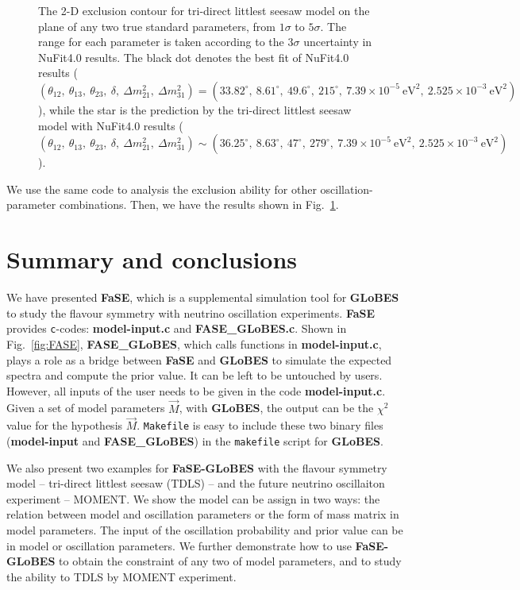 \documentclass[aps,prd,nofootinbib,preprint]{revtex4}
\begin{document}
\begin{figure}[!h]
 \caption{\label{fig:SR_2D}The 2-D exclusion contour for tri-direct littlest seesaw model on the plane of any two true standard parameters, from $1\sigma$ to $5\sigma$. The range for each parameter is taken according to the $3\sigma$ uncertainty in NuFit4.0 results. The black dot denotes the best fit of NuFit4.0 results ($(\theta_{12},~\theta_{13},~\theta_{23},~\delta,~\Delta m_{21}^2,~\Delta m_{31}^2)=(33.82^\circ,~8.61^\circ,~49.6^\circ,~215^\circ,~7.39\times10^{-5}~\text{eV}^2,~2.525\times10^{-3}~\text{eV}^2)$), while the star is the prediction by the tri-direct littlest seesaw model with NuFit4.0 results ($(\theta_{12},~\theta_{13},~\theta_{23},~\delta,~\Delta m_{21}^2,~\Delta m_{31}^2)\sim(36.25^\circ,~8.63^\circ,~47^\circ,~279^\circ,~7.39\times10^{-5}~\text{eV}^2,~2.525\times10^{-3}~\text{eV}^2)$).}
\end{figure}

We use the same code to analysis the exclusion ability for other oscillation-parameter combinations. Then, we have the results shown in Fig.~\ref{fig:SR_2D}.

\section{Summary and conclusions}

We have presented \textbf{FaSE}, which is a supplemental simulation tool for \textbf{GLoBES} to study the flavour symmetry with neutrino oscillation experiments. \textbf{FaSE} provides \texttt{c}-codes: \textbf{model-input.c} and \textbf{FASE\_GLoBES.c}. Shown in Fig.~\ref{fig:FASE}, \textbf{FASE\_GLoBES}, which calls functions in \textbf{model-input.c}, plays a role as a bridge between \textbf{FaSE} and \textbf{GLoBES} to simulate the expected spectra and compute the prior value. It can be left to be untouched by users. However, all inputs of the user needs to be given in the code \textbf{model-input.c}. Given a set of model parameters $\vec{M}$, with \textbf{GLoBES}, the output can be the $\chi^2$ value for the hypothesis $\vec{M}$. {\color{red}\texttt{Makefile} is easy to include these two binary files (\textbf{model-input} and \textbf{FASE\_GLoBES}) in the \texttt{makefile} script for \textbf{GLoBES}. }

We also present two examples for \textbf{FaSE-GLoBES} with the flavour symmetry model -- tri-direct littlest seesaw (TDLS) -- and the future neutrino oscillaiton experiment -- MOMENT. We show the model can be assign in two ways: the relation between model and oscillation parameters or the form of mass matrix in model parameters. The input of the oscillation probability and prior value can be in model or oscillation parameters. We further demonstrate how to use \textbf{FaSE-GLoBES} to obtain the constraint of any two of model parameters, and to study the ability to TDLS by MOMENT experiment. 
\end{document}
